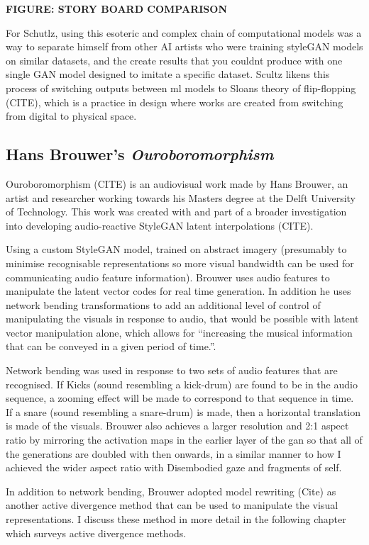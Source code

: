 \textbf{FIGURE: STORY BOARD COMPARISON}

For Schutlz, using this esoteric and complex chain of computational models was a way to separate himself from other AI artists who were training styleGAN models on similar datasets, and the create results that you couldnt produce with one single GAN model designed to imitate a specific dataset. 
Scultz likens this process of switching outputs between ml models to Sloans theory of flip-flopping (CITE), which is a practice in design where works are created from switching from digital to physical space.

\subsection{Hans Brouwer's \textit{Ouroboromorphism}}

Ouroboromorphism (CITE) is an audiovisual work made by Hans Brouwer, an artist and researcher working towards his Masters degree at the Delft University of Technology. 
This work was created with and part of a broader investigation into developing audio-reactive StyleGAN latent interpolations (CITE). 

Using a custom StyleGAN model, trained on abstract imagery (presumably to minimise recognisable representations so more visual bandwidth can be used for communicating audio feature information).
 Brouwer uses audio features to manipulate the latent vector codes for real time generation. 
 In addition he uses network bending transformations to add an additional level of control of manipulating the visuals in response to audio, that would be possible with latent vector manipulation alone, which allows for “increasing the musical information that can be conveyed in a given period of time.”. 

Network bending was used in response to two sets of audio features that are recognised.
If Kicks (sound resembling a kick-drum) are found to be in the audio sequence, a zooming effect will be made to correspond to that sequence in time. If a snare (sound resembling a snare-drum) is made, then a horizontal translation is made of the visuals. 
Brouwer also achieves a larger resolution and 2:1 aspect ratio by mirroring the activation maps in the earlier layer of the gan so that all of the generations are doubled with then onwards, in a similar manner to how I achieved the wider aspect ratio with Disembodied gaze and fragments of self. 

In addition to network bending, Brouwer adopted model rewriting (Cite) as another active divergence method that can be used to manipulate the visual representations. 
I discuss these method in more detail in the following chapter which surveys active divergence methods.

